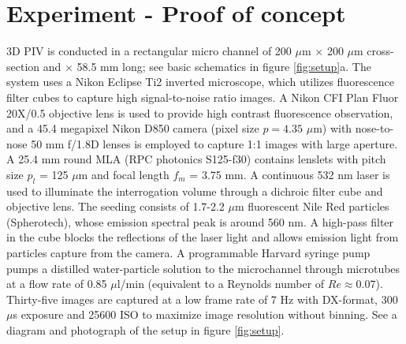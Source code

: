 \documentclass[draftthesis,fullpage]{uiucthesis}
\begin{document}
\section*{Experiment - Proof of concept}
3D PIV is conducted in a rectangular micro channel of 200 $\mu$m $\times$ 200 $\mu$m cross-section and $\times$ 58.5 mm long; see basic schematics  in figure \ref{fig:setup}a. The system uses a Nikon Eclipse Ti2 inverted microscope, which utilizes fluorescence filter cubes to capture high signal-to-noise ratio images. A Nikon CFI Plan Fluor 20X/0.5 objective lens is used to provide high contrast fluorescence observation, and a 45.4 megapixel Nikon D850 camera (pixel size $p=4.35$ $\mu$m) with nose-to-nose 50 mm f/1.8D lenses is employed to capture 1:1 images with large aperture. A 25.4 mm round MLA (RPC photonics S125-f30) contains lenslets with pitch size $p_l$ = 125 $\mu$m and focal length $f_m$ = 3.75 mm. 
A continuous 532 nm laser is used to illuminate the interrogation volume through a dichroic filter cube and objective lens. The seeding consists of 1.7-2.2 $\mu$m fluorescent Nile Red particles (Spherotech), whose emission spectral peak is around 560 nm. A high-pass filter in the cube blocks the reflections of the laser light and allows emission light from particles capture from the camera. A programmable Harvard syringe pump pumps a distilled water-particle solution to the microchannel through microtubes at a flow rate of  0.85 $\mu$l/min (equivalent to a Reynolds number of $Re\approx 0.07$). Thirty-five images are captured at a low frame rate of 7 Hz with DX-format, 300 $\mu$s exposure and 25600 ISO to maximize image resolution without binning.  See a diagram and photograph of the setup in figure \ref{fig:setup}.
\end{document}
